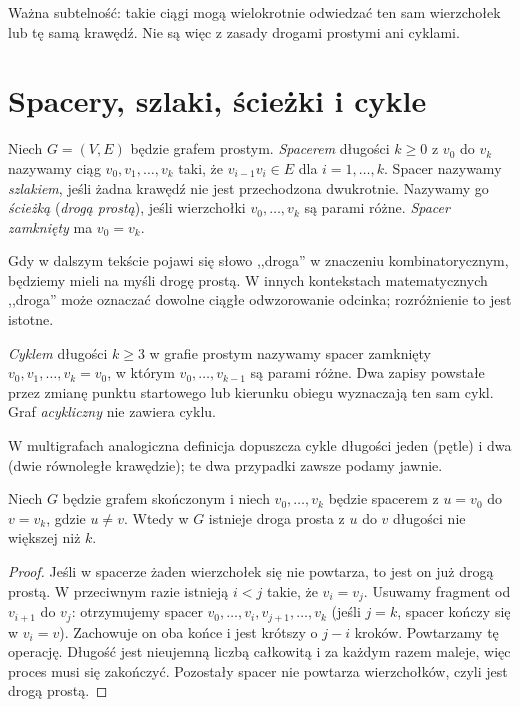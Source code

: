 Ważna subtelność: takie ciągi mogą wielokrotnie odwiedzać
ten sam wierzchołek lub tę samą krawędź. Nie są więc z zasady
drogami prostymi ani cyklami.

\section{Spacery, szlaki, ścieżki i cykle}
\label{sec:tg-drogi}

\begin{definicja}
Niech $G=(V,E)$ będzie grafem prostym.
\emph{Spacerem} długości $k\ge0$ z $v_0$ do $v_k$
nazywamy ciąg $v_0,v_1,\ldots,v_k$ taki, że
$v_{i-1}v_i\in E$ dla $i=1,\ldots,k$.
Spacer nazywamy \emph{szlakiem}, jeśli żadna
krawędź nie jest przechodzona dwukrotnie.
Nazywamy go \emph{ścieżką} (\emph{drogą prostą}), jeśli
wierzchołki $v_0,\ldots,v_k$ są parami różne.
\emph{Spacer zamknięty} ma $v_0=v_k$.
\end{definicja}

Gdy w dalszym tekście pojawi się słowo ,,droga'' w znaczeniu
kombinatorycznym, będziemy mieli na myśli drogę prostą. W innych kontekstach matematycznych
,,droga'' może oznaczać dowolne ciągłe odwzorowanie odcinka;
rozróżnienie to jest istotne.

\begin{definicja}[Cykl]
\emph{Cyklem} długości $k\ge3$ w grafie prostym
nazywamy spacer zamknięty $v_0,v_1,\ldots,v_k=v_0$,
w którym $v_0,\ldots,v_{k-1}$ są parami różne.
Dwa zapisy powstałe przez zmianę punktu startowego
lub kierunku obiegu wyznaczają ten sam cykl.
Graf \emph{acykliczny} nie zawiera cyklu.
\end{definicja}

W multigrafach analogiczna definicja dopuszcza
cykle długości jeden (pętle) i dwa (dwie równoległe
krawędzie); te dwa przypadki zawsze podamy jawnie.

\begin{lemat}
Niech $G$ będzie grafem skończonym i niech
$v_0,\ldots,v_k$ będzie spacerem z $u=v_0$
do $v=v_k$, gdzie $u\ne v$. Wtedy w $G$
istnieje droga prosta z $u$ do $v$ długości
nie większej niż $k$.
\end{lemat}

\begin{proof}
Jeśli w spacerze żaden wierzchołek się nie powtarza,
to jest on już drogą prostą. W przeciwnym razie istnieją
$i<j$ takie, że $v_i=v_j$. Usuwamy fragment od
$v_{i+1}$ do $v_j$: otrzymujemy spacer
$v_0,\ldots,v_i,v_{j+1},\ldots,v_k$
(jeśli $j=k$, spacer kończy się w $v_i=v$).
Zachowuje on oba końce i jest krótszy o $j-i$ kroków.
Powtarzamy tę operację. Długość jest nieujemną liczbą
całkowitą i za każdym razem maleje, więc proces
musi się zakończyć. Pozostały spacer nie powtarza
wierzchołków, czyli jest drogą prostą.
\end{proof}


